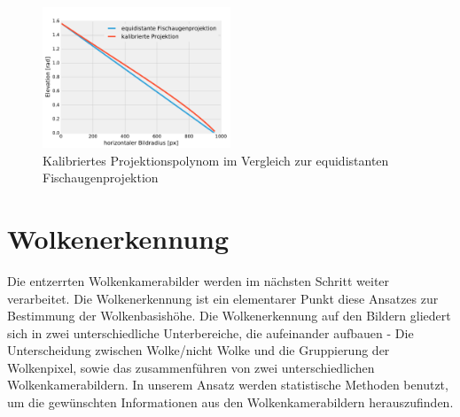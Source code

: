 \documentclass[a4paper,11pt,twoside,german]{article}
\begin{document}
\begin{figure}[!h]
\begin{center}
\includegraphics[width=0.5\textwidth]{media/projection-calibration.pdf}
\vspace{-0.7cm}
\caption[Kalibrierte Projektionsfunktion]{Kalibriertes Projektionspolynom im
Vergleich zur equidistanten Fischaugenprojektion}
\label{FIGProjektioncalib}
\end{center}
\end{figure}


\section{Wolkenerkennung}
Die entzerrten Wolkenkamerabilder werden im nächsten Schritt weiter verarbeitet. Die Wolkenerkennung ist ein elementarer Punkt diese Ansatzes zur Bestimmung der Wolkenbasishöhe. Die Wolkenerkennung auf den Bildern gliedert sich in zwei unterschiedliche Unterbereiche, die aufeinander aufbauen - Die Unterscheidung zwischen Wolke/nicht Wolke und die Gruppierung der Wolkenpixel, sowie das zusammenführen von zwei unterschiedlichen Wolkenkamerabildern. In unserem Ansatz werden statistische Methoden benutzt, um die gewünschten Informationen aus den Wolkenkamerabildern herauszufinden.
\end{document}
